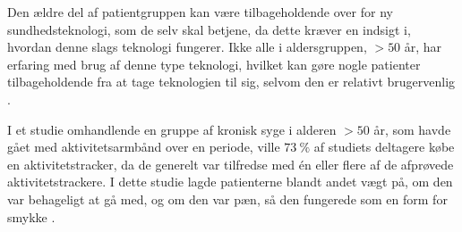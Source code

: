 Den ældre del af patientgruppen kan være tilbageholdende over for ny sundhedsteknologi, som de selv skal betjene, da dette kræver en indsigt i, hvordan denne slags teknologi fungerer. Ikke alle i aldersgruppen, $>50$ år, har erfaring med brug af denne type teknologi, hvilket kan gøre nogle patienter tilbageholdende fra at tage teknologien til sig, selvom den er relativt brugervenlig \citep{mercer2016}. 

I et studie omhandlende en gruppe af kronisk syge i alderen $>50$ år, som havde gået med aktivitetsarmbånd over en periode, ville $73~\%$ af studiets deltagere købe en aktivitetstracker, da de generelt var tilfredse med én eller flere af de afprøvede aktivitetstrackere. I dette studie lagde patienterne blandt andet vægt på, om den var behageligt at gå med, og om den var pæn, så den fungerede som en form for smykke \citep{mercer2016}.